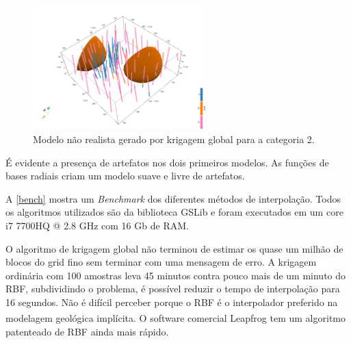 \begin{figure}[H]
	\caption{\label{global_krig}Modelo não realista gerado por krigagem global para a categoria 2.}
	\begin{center}
		\includegraphics[width=0.6\textwidth]{capitulo_2/globalind2.png}
	\end{center}
\end{figure}

É evidente a presença de artefatos nos dois primeiros modelos. As funções de bases radiais criam um modelo suave e livre de artefatos. 

A \autoref{bench} mostra um \textit{Benchmark} dos diferentes métodos de interpolação. Todos os algoritmos utilizados são da biblioteca GSLib e foram executados em um core i7 7700HQ @ 2.8 GHz com 16 Gb de RAM.

O algoritmo de krigagem global não terminou de estimar os quase um milhão de blocos do grid fino sem terminar com uma mensagem de erro. A krigagem ordinária com 100 amostras leva 45 minutos contra pouco mais de um minuto do RBF, subdividindo o problema, é possível reduzir o tempo de interpolação para 16 segundos. Não é difícil perceber porque o RBF é o interpolador preferido na modelagem geológica implícita. O software comercial Leapfrog \textsuperscript{\textregistered} tem um algoritmo patenteado de RBF ainda mais rápido.

